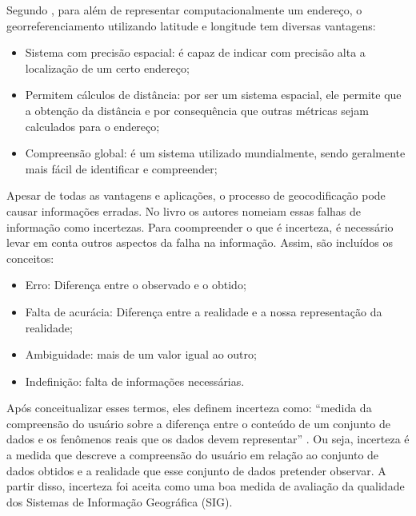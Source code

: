 Segundo \cite{longley2013}, para além de representar computacionalmente um endereço, o georreferenciamento utilizando latitude e longitude tem diversas vantagens:
\begin{itemize}
   \item Sistema com precisão espacial: é capaz de indicar com precisão alta a localização de um certo endereço;
   \item Permitem cálculos de distância: por ser um sistema espacial, ele permite que a  obtenção da distância e por consequência que outras métricas sejam calculados para o endereço;
   \item Compreensão global: é um sistema utilizado mundialmente, sendo geralmente mais fácil de identificar e compreender; 
\end{itemize}

Apesar de todas as vantagens e aplicações, o processo de geocodificação pode causar informações erradas. No livro \cite{longley2013} os autores nomeiam essas falhas de informação como incertezas. Para coompreender o que é incerteza, é necessário levar em conta outros aspectos da falha na informação. Assim, são incluídos os conceitos:
\begin{itemize}
   \item Erro: Diferença entre o observado e o obtido;
   \item Falta de acurácia: Diferença entre a realidade e a nossa representação da realidade;
   \item Ambiguidade: mais de um valor igual ao outro;
   \item Indefinição: falta de informações necessárias. 
\end{itemize}

Após conceitualizar esses termos, eles definem incerteza como: ``medida da compreensão do usuário sobre a diferença entre o conteúdo de um conjunto de dados e os fenômenos reais que os dados devem representar'' \cite{longley2013}. Ou seja, incerteza é a medida que descreve a compreensão do usuário em relação ao conjunto de dados obtidos e a realidade que esse conjunto de dados pretender observar.  A partir disso, incerteza foi aceita como uma boa medida de avaliação da qualidade dos Sistemas de Informação Geográfica (SIG). 

